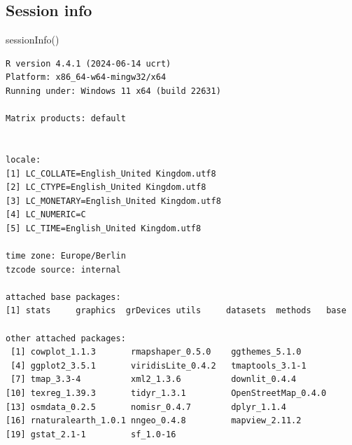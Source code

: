 \documentclass[
  letterpaper,
]{scrbook}
\newenvironment{Shaded}{\begin{snugshade}}{\end{snugshade}}
\newcommand{\FunctionTok}[1]{\textcolor[rgb]{0.28,0.35,0.67}{#1}}
\newcommand{\NormalTok}[1]{\textcolor[rgb]{0.00,0.23,0.31}{#1}}
\begin{document}
\hypertarget{session-info-1}{%
\subsection*{Session info}\label{session-info-1}}

\begin{Shaded}
\begin{Highlighting}[]
\FunctionTok{sessionInfo}\NormalTok{()}
\end{Highlighting}
\end{Shaded}

\begin{verbatim}
R version 4.4.1 (2024-06-14 ucrt)
Platform: x86_64-w64-mingw32/x64
Running under: Windows 11 x64 (build 22631)

Matrix products: default


locale:
[1] LC_COLLATE=English_United Kingdom.utf8 
[2] LC_CTYPE=English_United Kingdom.utf8   
[3] LC_MONETARY=English_United Kingdom.utf8
[4] LC_NUMERIC=C                           
[5] LC_TIME=English_United Kingdom.utf8    

time zone: Europe/Berlin
tzcode source: internal

attached base packages:
[1] stats     graphics  grDevices utils     datasets  methods   base     

other attached packages:
 [1] cowplot_1.1.3       rmapshaper_0.5.0    ggthemes_5.1.0     
 [4] ggplot2_3.5.1       viridisLite_0.4.2   tmaptools_3.1-1    
 [7] tmap_3.3-4          xml2_1.3.6          downlit_0.4.4      
[10] texreg_1.39.3       tidyr_1.3.1         OpenStreetMap_0.4.0
[13] osmdata_0.2.5       nomisr_0.4.7        dplyr_1.1.4        
[16] rnaturalearth_1.0.1 nngeo_0.4.8         mapview_2.11.2     
[19] gstat_2.1-1         sf_1.0-16          


\end{verbatim}
\end{document}
